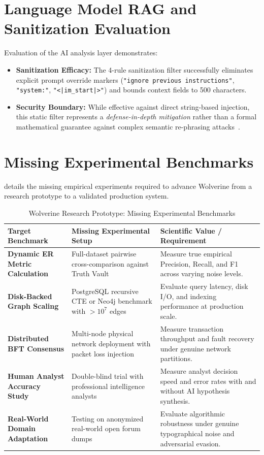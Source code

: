 \section{Language Model RAG and Sanitization Evaluation}
\label{sec:eval-rag}
Evaluation of the AI analysis layer demonstrates:
\begin{itemize}
    \item \textbf{Sanitization Efficacy:} The 4-rule sanitization filter successfully eliminates explicit prompt override markers (\texttt{"ignore previous instructions"}, \texttt{"system:"}, \texttt{"<|im\_start|>"}) and bounds context fields to 500 characters.
    \item \textbf{Security Boundary:} While effective against direct string-based injection, this static filter represents a \textit{defense-in-depth mitigation} rather than a formal mathematical guarantee against complex semantic re-phrasing attacks~\cite{perez2022ignore}.
\end{itemize}

\section{Missing Experimental Benchmarks}
\label{sec:eval-missing-experiments}
 details the missing empirical experiments required to advance Wolverine from a research prototype to a validated production system.

\begin{table}[htbp]
\centering
\small
\caption{Wolverine Research Prototype: Missing Experimental Benchmarks}
\label{tab:missing-experiments}
\begin{tabular}{@{}p{3.8cm}p{4.2cm}p{5.8cm}@{}}
\toprule
\textbf{Target Benchmark} & \textbf{Missing Experimental Setup} & \textbf{Scientific Value / Requirement} \\ \midrule
\textbf{Dynamic ER Metric Calculation} & Full-dataset pairwise cross-comparison against Truth Vault & Measure true empirical Precision, Recall, and F1 across varying noise levels. \\ \addlinespace
\textbf{Disk-Backed Graph Scaling} & PostgreSQL recursive CTE or Neo4j benchmark with $> 10^7$ edges & Evaluate query latency, disk I/O, and indexing performance at production scale. \\ \addlinespace
\textbf{Distributed BFT Consensus} & Multi-node physical network deployment with packet loss injection & Measure transaction throughput and fault recovery under genuine network partitions. \\ \addlinespace
\textbf{Human Analyst Accuracy Study} & Double-blind trial with professional intelligence analysts & Measure analyst decision speed and error rates with and without AI hypothesis synthesis. \\ \addlinespace
\textbf{Real-World Domain Adaptation} & Testing on anonymized real-world open forum dumps & Evaluate algorithmic robustness under genuine typographical noise and adversarial evasion. \\ \bottomrule
\end{tabular}
\end{table}

